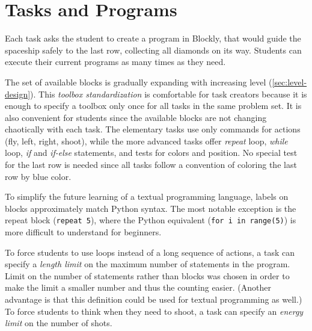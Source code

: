\section{Tasks and Programs}
\label{sec:robomission.programs}

Each task asks the student to create a program in Blockly,
that would guide the spaceship safely to the last row,
collecting all diamonds on its way. %
Students can execute their current programs as many times
as they need. %

The set of available blocks is gradually expanding with
increasing level (\cref{sec:level-design}). This \emph{toolbox standardization}
is comfortable for task creators because it is enough to specify
a toolbox only once for all tasks in the same problem set.
It is also convenient for students since
the available blocks are not changing chaotically with each task.
The elementary tasks use only commands for actions (fly, left, right, shoot),
while the more advanced tasks offer \emph{repeat} loop, \emph{while} loop,
\emph{if} and \emph{if-else} statements,
and tests for colors and position.
No special test for the last row is needed since all tasks follow a convention
of coloring the last row by blue color.

To simplify the future learning of a textual programming language,
labels on blocks approximately match Python syntax. %
The most notable exception is the repeat block (\texttt{repeat 5}),
where the Python equivalent (\texttt{for i in range(5)}) is more difficult
to understand for beginners.

To force students to use loops instead of a long sequence of actions,
a task can specify a \emph{length limit}
on the maximum number of statements in the program.
Limit on the number of statements rather than blocks was chosen in
order to make the limit a smaller number and thus the counting easier.
(Another advantage is that this definition could be used for textual
programming as well.)
To force students to think when they need to shoot, a task can specify
an \emph{energy limit} on the number of shots.

